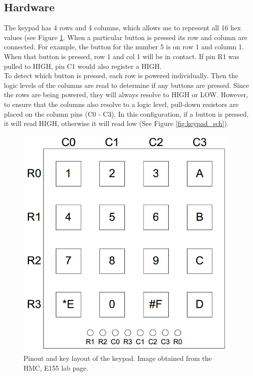 \documentclass[11pt]{article}
\begin{document}
\subsection{Hardware}

The keypad has 4 rows and 4 columns, which allows me to represent all 16 hex values (see Figure \ref{fig:keypad_pinout}. When a particular button is pressed its row and column are connected. For example, the button for the number 5 is on row 1 and column 1. When that button is pressed, row 1 and col 1 will be in contact. If pin R1 was pulled to HIGH, pin C1 would also register a HIGH. \\

To detect which button is pressed, each row is powered individually. Then the logic levels of the columns are read to determine if any buttons are pressed. Since the rows are being powered, they will always resolve to HIGH or LOW. However, to ensure that the columns also resolve to a logic level, pull-down resistors are placed on the column pins (C0 - C3). In this configuration, if a button is pressed, it will read HIGH, otherwise it will read low (See Figure \ref{fig:keypad_sch}). \\


\begin{figure}[h!]
\centering
\includegraphics[scale=0.35]{keypad_pinout.png}
\caption{Pinout and key layout of the keypad. Image obtained from the HMC, E155 lab page.}
\label{fig:keypad_pinout}
\end{figure} 
\end{document}
